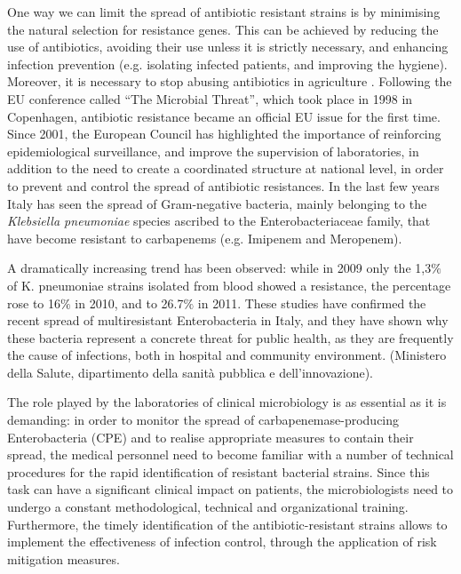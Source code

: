 \documentclass[11pt]{report}
\begin{document}
One way we can limit the spread of antibiotic resistant strains is by minimising the natural selection for resistance genes.
This can be achieved by reducing the use of antibiotics, avoiding their use unless it is strictly necessary, and enhancing infection prevention (e.g. isolating infected patients, and improving the hygiene). 
Moreover, it is necessary to stop abusing antibiotics in agriculture \cite{Spellberg2014} \cite{doi:10.1093/emph/eou024}.
Following the EU conference called “The Microbial Threat”, which took place in 1998 in Copenhagen, antibiotic resistance became an official EU issue for the first time. 
Since 2001, the European Council has highlighted the importance of reinforcing epidemiological surveillance, and improve the supervision of laboratories, in addition to the need to create a  coordinated structure at national level, in order to prevent and control the spread of antibiotic resistances.
In the last few years Italy has seen the spread of Gram-negative bacteria, mainly belonging to the \emph{Klebsiella pneumoniae} species ascribed to the Enterobacteriaceae family, that have become resistant to carbapenems (e.g. Imipenem and Meropenem).

A dramatically increasing trend has been observed: while in 2009 only the 1,3$\%$ of K. pneumoniae strains isolated from blood showed a resistance, the percentage rose to 16$\%$ in 2010, and to 26.7$\%$ in 2011.
These studies have confirmed the recent spread of multiresistant Enterobacteria in Italy, and they have shown why these bacteria represent a concrete threat for public health, as they are frequently the cause of infections, both in hospital and community environment.
(Ministero della Salute, dipartimento della sanità pubblica e dell’innovazione).

The role played by the laboratories of clinical microbiology is as essential as it is demanding: in order to monitor the spread of carbapenemase-producing Enterobacteria (CPE) and to realise appropriate measures to contain their spread, the medical personnel need to become familiar with a number of technical procedures for the rapid identification of resistant bacterial strains. 
Since this task can have a significant clinical impact on patients, the microbiologists need to undergo a constant methodological, technical and organizational training. 
Furthermore, the timely identification of the antibiotic-resistant strains allows to implement the effectiveness of infection control, through the application of risk mitigation measures.
\end{document}
